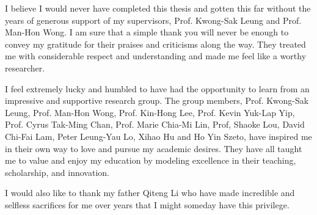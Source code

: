 I believe I would never have completed this thesis and gotten this far without the years of generous support of my supervisors, Prof. Kwong-Sak Leung and Prof. Man-Hon Wong. I am sure that a simple thank you will never be enough to convey my gratitude for their praises and criticisms along the way. They treated me with considerable respect and understanding and made me feel like a worthy researcher.

I feel extremely lucky and humbled to have had the opportunity to learn from an impressive and supportive research group. The group members, Prof. Kwong-Sak Leung, Prof. Man-Hon Wong, Prof. Kin-Hong Lee, Prof. Kevin Yuk-Lap Yip, Prof. Cyrus Tak-Ming Chan, Prof. Marie Chia-Mi Lin, Prof, Shaoke Lou, David Chi-Fai Lam, Peter Leung-Yau Lo, Xihao Hu and Ho Yin Szeto, have inspired me in their own way to love and pursue my academic desires. They have all taught me to value and enjoy my education by modeling excellence in their teaching, scholarship, and innovation.

I would also like to thank my father Qiteng Li who have made incredible and selfless sacrifices for me over years that I might someday have this privilege.
